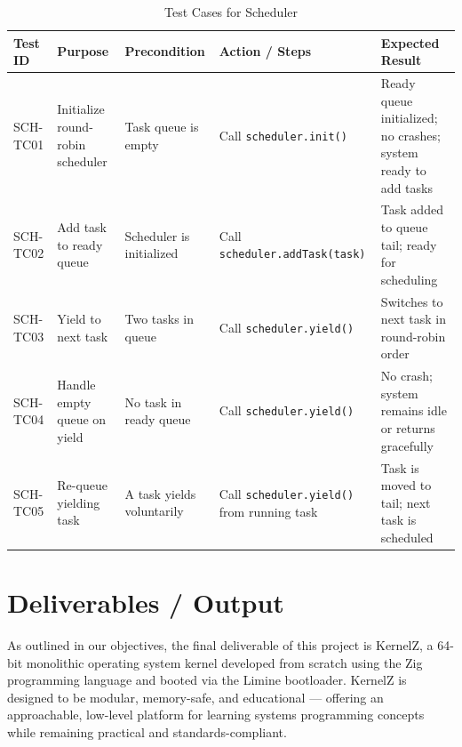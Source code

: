 \documentclass[12pt]{extarticle}
\begin{document}
\begin{table}[H]
\centering
\renewcommand{\arraystretch}{1.3}
\begin{tabular}{|p{1.4cm}|p{3.2cm}|p{3.0cm}|p{3.4cm}|p{3.4cm}|}
\hline
\textbf{Test ID} & \textbf{Purpose} & \textbf{Precondition} & \textbf{Action / Steps} & \textbf{Expected Result} \\
\hline

SCH-TC01 & Initialize round-robin scheduler & Task queue is empty & Call \texttt{scheduler.init()} & Ready queue initialized; no crashes; system ready to add tasks \\
\hline

SCH-TC02 & Add task to ready queue & Scheduler is initialized & Call \texttt{scheduler.addTask(task)} & Task added to queue tail; ready for scheduling \\
\hline

SCH-TC03 & Yield to next task & Two tasks in queue & Call \texttt{scheduler.yield()} & Switches to next task in round-robin order \\
\hline

SCH-TC04 & Handle empty queue on yield & No task in ready queue & Call \texttt{scheduler.yield()} & No crash; system remains idle or returns gracefully \\
\hline

SCH-TC05 & Re-queue yielding task & A task yields voluntarily & Call \texttt{scheduler.yield()} from running task & Task is moved to tail; next task is scheduled \\
\hline

\end{tabular}
\caption{Test Cases for Scheduler}
\label{table:scheduler-main-tests}
\end{table}



\pagebreak
\section{Deliverables / Output}

As outlined in our objectives, the final deliverable of this project is KernelZ, a 64-bit monolithic operating system kernel developed from scratch using the Zig programming language and booted via the Limine bootloader. KernelZ is designed to be modular, memory-safe, and educational — offering an approachable, low-level platform for learning systems programming concepts while remaining practical and standards-compliant.
\end{document}
